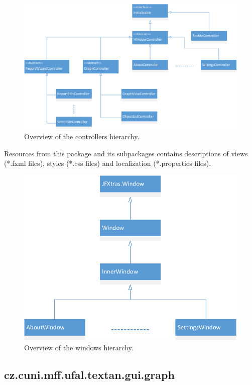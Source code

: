 \begin{figure}[!htb]
        \centering
        \includegraphics[width=\textwidth]{Images/Controllers}
        \caption{Overview of the controllers hierarchy.}
        \label{fig:Controllers}
\end{figure}

Resources from this package and its subpackages contains descriptions of views
(*.fxml files), styles (*.css files) and localization (*.properties files).

\begin{figure}[!htb]
        \centering
        \includegraphics[width=\textwidth]{Images/Windows}
        \caption{Overview of the windows hierarchy.}
        \label{fig:Windows}
\end{figure}

\subsection{cz.cuni.mff.ufal.textan.gui.graph}

